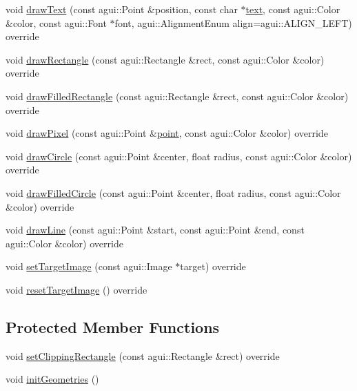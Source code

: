 \begin{DoxyCompactItemize}
void \mbox{\hyperlink{classec_1_1_open_g_l_graphics_ae3901503a573bd38db1a13d9ceca4054}{draw\+Text}} (const agui\+::\+Point \&position, const char $\ast$\mbox{\hyperlink{namespaceec_a0bdee24285d69deca899e166b29c0150}{text}}, const agui\+::\+Color \&color, const agui\+::\+Font $\ast$font, agui\+::\+Alignment\+Enum align=agui\+::\+A\+L\+I\+G\+N\+\_\+\+L\+E\+FT) override
\item 
void \mbox{\hyperlink{classec_1_1_open_g_l_graphics_a9aca169aa522b2daca935407d865c84f}{draw\+Rectangle}} (const agui\+::\+Rectangle \&rect, const agui\+::\+Color \&color) override
\item 
void \mbox{\hyperlink{classec_1_1_open_g_l_graphics_abfd38f4ba4c8d04ed80c62c06895ef98}{draw\+Filled\+Rectangle}} (const agui\+::\+Rectangle \&rect, const agui\+::\+Color \&color) override
\item 
void \mbox{\hyperlink{classec_1_1_open_g_l_graphics_a3f747db5664a109b28c66de6e092fbcf}{draw\+Pixel}} (const agui\+::\+Point \&\mbox{\hyperlink{namespaceec_a30e2a743ebdeb02ac68a6cfa50f629c7a78ee54aa8f813885fe2fe20d232518b9}{point}}, const agui\+::\+Color \&color) override
\item 
void \mbox{\hyperlink{classec_1_1_open_g_l_graphics_aeccf106f9e5f5da14db66d39595fc6e9}{draw\+Circle}} (const agui\+::\+Point \&center, float radius, const agui\+::\+Color \&color) override
\item 
void \mbox{\hyperlink{classec_1_1_open_g_l_graphics_aec55bf7ce016cf9eb3f2a01adaafefa4}{draw\+Filled\+Circle}} (const agui\+::\+Point \&center, float radius, const agui\+::\+Color \&color) override
\item 
void \mbox{\hyperlink{classec_1_1_open_g_l_graphics_a174cd34243e20b2639ece416b4df3a6b}{draw\+Line}} (const agui\+::\+Point \&start, const agui\+::\+Point \&end, const agui\+::\+Color \&color) override
\item 
void \mbox{\hyperlink{classec_1_1_open_g_l_graphics_a2fd15c1fa0a4e87faa64273fd4407c1d}{set\+Target\+Image}} (const agui\+::\+Image $\ast$target) override
\item 
void \mbox{\hyperlink{classec_1_1_open_g_l_graphics_a16be712e57304e998ad6756c0ef17124}{reset\+Target\+Image}} () override
\end{DoxyCompactItemize}
\subsection*{Protected Member Functions}
\begin{DoxyCompactItemize}
\item 
void \mbox{\hyperlink{classec_1_1_open_g_l_graphics_a6e0b9ec8acb248e34560e0694b413b90}{set\+Clipping\+Rectangle}} (const agui\+::\+Rectangle \&rect) override
\item 
void \mbox{\hyperlink{classec_1_1_open_g_l_graphics_ae6eeb83c6f80766df74bb1e98803cb41}{init\+Geometries}} ()
\end{DoxyCompactItemize}
